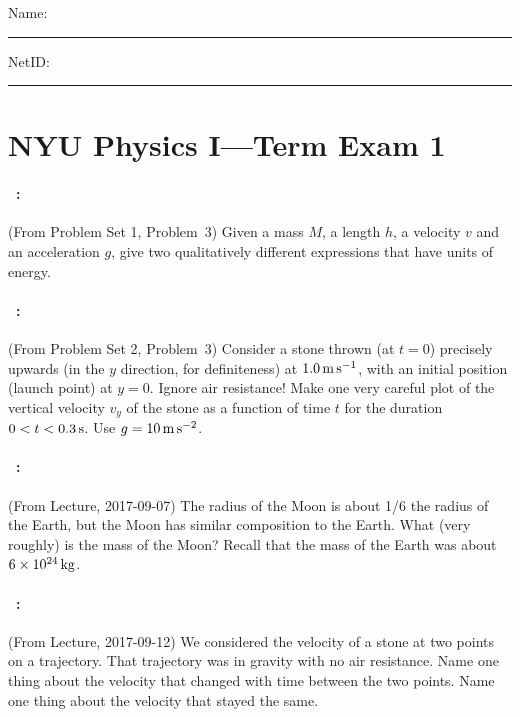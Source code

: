 \documentclass[12pt]{article}
\begin{document}
\noindent
Name: \rule[-1ex]{0.55\textwidth}{0.1pt}
NetID: \rule[-1ex]{0.2\textwidth}{0.1pt}

\section*{NYU Physics I---Term Exam 1}

\paragraph{\problemname~\theproblem:}%
(From Problem Set 1, Problem~3)
Given a mass $M$, a length $h$, a velocity $v$ and an acceleration
$g$, give two qualitatively different expressions that have units of
energy.

\vfill

\paragraph{\problemname~\theproblem:}%
(From Problem Set 2, Problem~3)
Consider a stone thrown (at $t=0$) precisely upwards (in the $y$
direction, for definiteness) at $1.0\,\mathrm{m}\,\mathrm{s}^{-1}$, with an initial
position (launch point) at $y=0$.  Ignore air resistance! Make one
very careful plot of the vertical velocity $v_y$ of the stone as a
function of time $t$ for the duration $0<t<0.3\,\mathrm{s}$. Use
$g=10\,\mathrm{m}\,\mathrm{s}^{-2}$.

\vfill

\paragraph{\problemname~\theproblem:}%
(From Lecture, 2017-09-07)
The radius of the Moon is about 1/6 the radius of the Earth, but
the Moon has similar composition to the Earth. What (very roughly)
is the mass of the Moon? Recall that the mass of the Earth was
about $6\times 10^{24}\,\mathrm{kg}$.

\vfill

\clearpage
\paragraph{\problemname~\theproblem:}%
(From Lecture, 2017-09-12)
We considered the velocity of a stone at two points on a trajectory.
That trajectory was in gravity with no air resistance.
Name one thing about the velocity that changed with time between
the two points.
Name one thing about the velocity that stayed the same.
\end{document}
